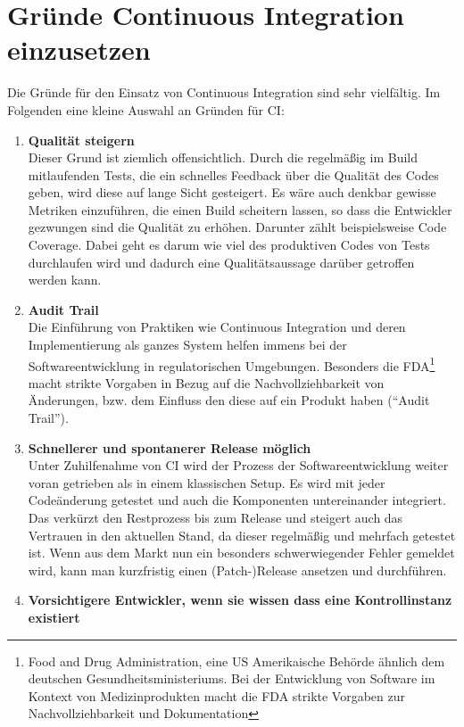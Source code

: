 \section{Gründe Continuous Integration einzusetzen}\label{sec:Gründe Continuous Integration einzusetzen}
Die Gründe für den Einsatz von Continuous Integration sind sehr vielfältig. Im Folgenden eine kleine Auswahl an Gründen für CI:
\begin{enumerate}
	\item \textbf{Qualität steigern}\\
	Dieser Grund ist ziemlich offensichtlich. Durch die regelmäßig im Build mitlaufenden Tests, die ein schnelles Feedback über die Qualität des Codes geben, wird diese auf lange Sicht gesteigert. Es wäre auch denkbar gewisse Metriken einzuführen, die einen Build scheitern lassen, so dass die Entwickler gezwungen sind die Qualität zu erhöhen. Darunter zählt beispielsweise Code Coverage. Dabei geht es darum wie viel des produktiven Codes von Tests durchlaufen wird und dadurch eine Qualitätsaussage darüber getroffen werden kann.	
	\item \textbf{Audit Trail}\\
	Die Einführung von Praktiken wie Continuous Integration und deren Implementierung als ganzes System helfen immens bei der Softwareentwicklung in regulatorischen Umgebungen. Besonders die FDA\footnote{Food and Drug Administration, eine US Amerikaische Behörde ähnlich dem deutschen Gesundheitsministeriums. Bei der Entwicklung von Software im Kontext von Medizinprodukten macht die FDA strikte Vorgaben zur Nachvollziehbarkeit und Dokumentation} macht strikte Vorgaben in Bezug auf die Nachvollziehbarkeit von Änderungen, bzw. dem Einfluss den diese auf ein Produkt haben ("`Audit Trail"').
	\item \textbf{Schnellerer und spontanerer Release möglich}\\
	Unter Zuhilfenahme von CI wird der Prozess der Softwareentwicklung weiter voran getrieben als in einem klassischen Setup. Es wird mit jeder Codeänderung getestet und auch die Komponenten untereinander integriert. Das verkürzt den Restprozess bis zum Release und steigert auch das Vertrauen in den aktuellen Stand, da dieser regelmäßig und mehrfach getestet ist. Wenn aus dem Markt nun ein besonders schwerwiegender Fehler gemeldet wird, kann man kurzfristig einen (Patch-)Release ansetzen und durchführen.
	\item \textbf{Vorsichtigere Entwickler, wenn sie wissen dass eine Kontrollinstanz existiert}\\

\end{enumerate}
